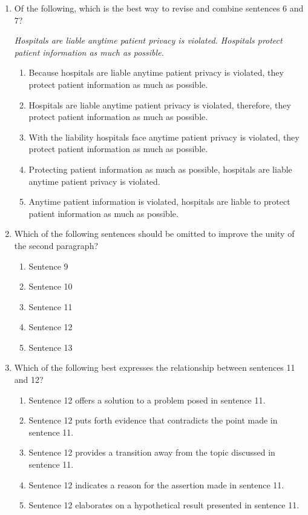 \documentclass[12pt]{book}
\begin{document}
\begin{enumerate}
\bigskip
\item{Of the following, which is the best way to revise and combine sentences 6 and 7?}

\bigskip
\textit{Hospitals are liable anytime patient privacy is violated. Hospitals protect patient information as much as possible.}

\begin{enumerate}[label=(\Alph*)]
\item{Because hospitals are liable anytime patient privacy is violated, they protect patient information as much as possible.}
\item{Hospitals are liable anytime patient privacy is violated, therefore, they protect patient information as much as possible.}
\item{With the liability hospitals face anytime patient privacy is violated, they protect patient information as much as possible.}
\item{Protecting patient information as much as possible, hospitals are liable anytime patient privacy is violated.}
\item{Anytime patient information is violated, hospitals are liable to protect patient information as much as possible.}
\end{enumerate}

\newpage
\item{Which of the following sentences should be omitted to improve the unity of the second paragraph?}
\begin{enumerate}[label=(\Alph*)]
\item{Sentence 9}
\item{Sentence 10}
\item{Sentence 11}
\item{Sentence 12}
\item{Sentence 13}
\end{enumerate}

\bigskip
\item{Which of the following best expresses the relationship between sentences 11 and 12?}

\begin{enumerate}[label=(\Alph*)]
\item{Sentence 12 offers a solution to a problem posed in sentence 11.}
\item{Sentence 12 puts forth evidence that contradicts the point made in sentence 11.}
\item{Sentence 12 provides a transition away from the topic discussed in sentence 11.}
\item{Sentence 12 indicates a reason for the assertion made in sentence 11.} 
\item{Sentence 12 elaborates on a hypothetical result presented in sentence 11.}
\end{enumerate}
\end{enumerate}
\end{document}
